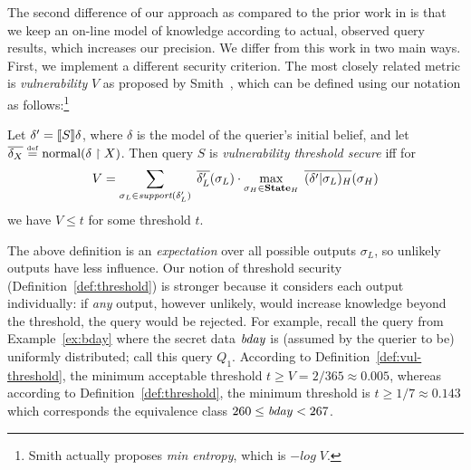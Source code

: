 The second difference of our approach as compared to
the prior work in
\cite{clark2005QIF,backes09automatic,kopf:rybalchenko,Mu:2009:inverval-qif}
is that we keep an
on-line model of knowledge according to actual, observed query results,
which increases our precision.
\else
We differ from this work in two main ways.  First, we implement a
different security criterion.  The most closely related metric is
\emph{vulnerability} $V$ as proposed by Smith~\cite{smith09foundations},
which can be defined using our notation as follows:\footnote{Smith
  actually proposes \emph{min entropy}, which is $-\mathit{log}\;V$.}
\begin{definition}
\label{def:vul-threshold}
Let $\delta' = [\![{S}]\!]{\delta}$, where $\delta$ is the model of the
querier's initial belief, and let $\overline{\delta_X} \stackrel{\smash{\scriptscriptstyle \mathrm{def}}}=
\text{normal}(\delta \upharpoonright X)$.  Then query $S$ is \emph{vulnerability 
  threshold secure} iff for $$V = \sum_{\sigma_L \in
  \textit{support}(\delta'_L)}\; \overline{\delta'_L}(\sigma_L) \cdot \max_{\sigma_H \in \textbf{State}_H}\;
  \overline{(\delta' | \sigma_L)_H}(\sigma_H)$$
  we have $V \leq t$ for some threshold $t$.
\end{definition}
The above definition is an \emph{expectation}
over all possible outputs $\sigma_L$, so unlikely outputs have less
influence.  Our notion of threshold security
(Definition~\ref{def:threshold}) is stronger because it considers each
output individually: if \emph{any} output, however unlikely, would
increase knowledge beyond the threshold, the query would be rejected.
For example, recall the query from Example~\ref{ex:bday} where the
secret data $\mathit{bday}$ is (assumed by the querier to be) uniformly
distributed; call this query $Q_1$.  According to
Definition~\ref{def:vul-threshold}, the minimum acceptable threshold
$t \geq V = 2/365 \approx 0.005$, whereas according to
Definition~\ref{def:threshold}, the minimum threshold is $t \geq 1/7 \approx
0.143$ which corresponds the equivalence class $260 \leq \mathit{bday} <
267$.

